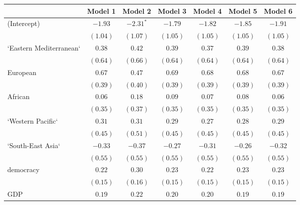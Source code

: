 
\begin{table}[!h]
\begin{center}
\begin{tabular}{l c c c c c c }
\toprule
 & Model 1 & Model 2 & Model 3 & Model 4 & Model 5 & Model 6 \\
\midrule
(Intercept)             & $-1.93$      & $-2.31^{*}$  & $-1.79$      & $-1.82$      & $-1.85$      & $-1.91$      \\
                        & $(1.04)$     & $(1.07)$     & $(1.05)$     & $(1.05)$     & $(1.05)$     & $(1.05)$     \\
`Eastern Mediterranean` & $0.38$       & $0.42$       & $0.39$       & $0.37$       & $0.39$       & $0.38$       \\
                        & $(0.64)$     & $(0.66)$     & $(0.64)$     & $(0.64)$     & $(0.64)$     & $(0.64)$     \\
European                & $0.67$       & $0.47$       & $0.69$       & $0.68$       & $0.68$       & $0.67$       \\
                        & $(0.39)$     & $(0.40)$     & $(0.39)$     & $(0.39)$     & $(0.39)$     & $(0.39)$     \\
African                 & $0.06$       & $0.18$       & $0.09$       & $0.07$       & $0.08$       & $0.06$       \\
                        & $(0.35)$     & $(0.37)$     & $(0.35)$     & $(0.35)$     & $(0.35)$     & $(0.35)$     \\
`Western Pacific`       & $0.31$       & $0.31$       & $0.29$       & $0.27$       & $0.28$       & $0.29$       \\
                        & $(0.45)$     & $(0.51)$     & $(0.45)$     & $(0.45)$     & $(0.45)$     & $(0.45)$     \\
`South-East Asia`       & $-0.33$      & $-0.37$      & $-0.27$      & $-0.31$      & $-0.26$      & $-0.32$      \\
                        & $(0.55)$     & $(0.55)$     & $(0.55)$     & $(0.55)$     & $(0.55)$     & $(0.55)$     \\
democracy               & $0.22$       & $0.30$       & $0.23$       & $0.22$       & $0.23$       & $0.23$       \\
                        & $(0.15)$     & $(0.16)$     & $(0.15)$     & $(0.15)$     & $(0.15)$     & $(0.15)$     \\
GDP                     & $0.19$       & $0.22$       & $0.20$       & $0.20$       & $0.19$       & $0.19$       \\

\end{tabular}
\end{center}
\end{table}
